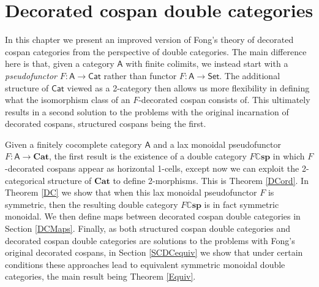 \documentclass[oneside,final]{ucr}
\theoremstyle{definition}
\begin{document}
{\ssp
\chapter{Decorated cospan double categories}\label{Chapter4}

In this chapter we present an improved version of Fong's theory of decorated cospan categories \cite{Fong} from the perspective of double categories. The main difference here is that, given a category $\mathsf{A}$ with finite colimits, we instead start with a \emph{pseudofunctor} $F \colon \mathsf{A} \to \mathsf{Cat}$ rather than functor $F \colon \mathsf{A} \to \mathsf{Set}$. The additional structure of $\mathsf{Cat}$ viewed as a 2-category then allows us more flexibility in defining what the isomorphism class of an $F$-decorated cospan consists of. This ultimately results in a second solution to the problems with the original incarnation of decorated cospans, structured cospans being the first.

Given a finitely cocomplete category $\mathsf{A}$ and a lax monoidal pseudofunctor $F \colon \mathsf{A} \to \mathbf{Cat}$, the first result is the existence of a double category $F\mathbb{C}\mathbf{sp}$ in which $F$-decorated cospans appear as horizontal 1-cells, except now we can exploit the 2-categorical structure of $\mathbf{Cat}$ to define 2-morphisms. This is Theorem \ref{DCord}. In Theorem \ref{DC} we show that when this lax monoidal pseudofunctor $F$ is symmetric, then the resulting double category $F\mathbb{C}\mathbf{sp}$ is in fact symmetric monoidal. We then define maps between decorated cospan double categories in Section \ref{DCMaps}. Finally, as both structured cospan double categories and decorated cospan double categories are solutions to the problems with Fong's original decorated cospans, in Section \ref{SCDCequiv} we show that under certain conditions these approaches lead to equivalent symmetric monoidal double categories, the main result being Theorem \ref{Equiv}.

}
\end{document}
